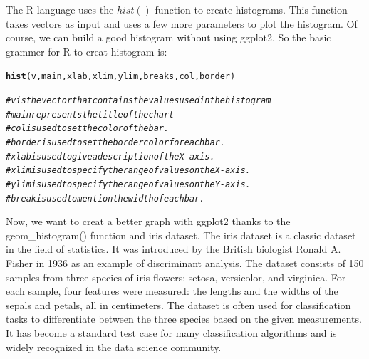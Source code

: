 \documentclass{article}\usepackage[]{graphicx}\usepackage[]{xcolor}
\makeatletter
\newcommand{\hlcom}[1]{\textcolor[rgb]{0.678,0.584,0.686}{\textit{#1}}}%
\newcommand{\hlstd}[1]{\textcolor[rgb]{0.345,0.345,0.345}{#1}}%
\newcommand{\hlkwd}[1]{\textcolor[rgb]{0.737,0.353,0.396}{\textbf{#1}}}%
\newenvironment{kframe}{%
 \def\at@end@of@kframe{}%
 \ifinner\ifhmode%
  \def\at@end@of@kframe{\end{minipage}}%
  \begin{minipage}{\columnwidth}%
 \fi\fi%
 \def\FrameCommand##1{\hskip\@totalleftmargin \hskip-\fboxsep
 \colorbox{shadecolor}{##1}\hskip-\fboxsep
     \hskip-\linewidth \hskip-\@totalleftmargin \hskip\columnwidth}%
 \MakeFramed {\advance\hsize-\width
   \@totalleftmargin\z@ \linewidth\hsize
   \@setminipage}}%
 {\par\unskip\endMakeFramed%
 \at@end@of@kframe}
\newenvironment{knitrout}{}{} %
\makeatother
\begin{document}
The R language uses the $hist()$ function to create histograms. This function takes vectors as input and uses a few more parameters to plot the histogram.
Of course, we can build a good histogram without using ggplot2.
So the basic grammer for R to creat histogram is:
\begin{knitrout}
\color{fgcolor}\begin{kframe}
\begin{alltt}
\hlkwd{hist}\hlstd{(v,main,xlab,xlim,ylim,breaks,col,border)}
\end{alltt}


{\ttfamily\noindent\bfseries\color{errorcolor}{\#\# Error in hist(v, main, xlab, xlim, ylim, breaks, col, border): object 'v' not found}}\begin{alltt}
\hlcom{#v is the vector that contains the values used in the histogram}
\hlcom{#main represents the title of the chart}
\hlcom{#col is used to set the color of the bar.}
\hlcom{#border is used to set the border color for each bar. }
\hlcom{#xlab is used to give a description of the X-axis. }
\hlcom{#xlim is used to specify the range of values on the X-axis. }
\hlcom{#ylim is used to specify the range of values on the Y-axis. }
\hlcom{#break is used to mention the width of each bar.}
\end{alltt}
\end{kframe}
\end{knitrout}
Now, we want to creat a better graph with ggplot2 thanks to the geom_histogram() function and iris dataset.
The iris dataset is a classic dataset in the field of statistics. It was introduced by the British biologist Ronald A. Fisher in 1936 as an example of discriminant analysis. The dataset consists of 150 samples from three species of iris flowers: setosa, versicolor, and virginica. For each sample, four features were measured: the lengths and the widths of the sepals and petals, all in centimeters. The dataset is often used for classification tasks to differentiate between the three species based on the given measurements. It has become a standard test case for many classification algorithms and is widely recognized in the data science community.
\end{document}
